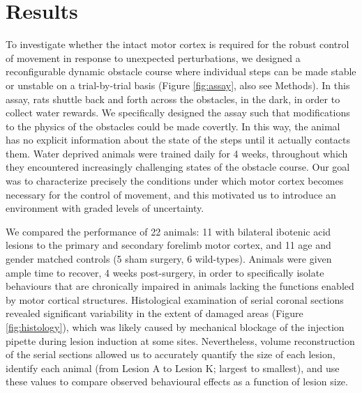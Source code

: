\section{Results}

To investigate whether the intact motor cortex is required for the robust control of movement in response to unexpected perturbations, we designed a reconfigurable dynamic obstacle course where individual steps can be made stable or unstable on a trial-by-trial basis (Figure \ref{fig:assay}, also see Methods). In this assay, rats shuttle back and forth across the obstacles, in the dark, in order to collect water rewards. We specifically designed the assay such that modifications to the physics of the obstacles could be made covertly. In this way, the animal has no explicit information about the state of the steps until it actually contacts them. Water deprived animals were trained daily for 4 weeks, throughout which they encountered increasingly challenging states of the obstacle course. Our goal was to characterize precisely the conditions under which motor cortex becomes necessary for the control of movement, and this motivated us to introduce an environment with graded levels of uncertainty.

We compared the performance of 22 animals: 11 with bilateral ibotenic acid lesions to the primary and secondary forelimb motor cortex, and 11 age and gender matched controls (5 sham surgery, 6 wild-types). Animals were given ample time to recover, 4 weeks post-surgery, in order to specifically isolate behaviours that are chronically impaired in animals lacking the functions enabled by motor cortical structures. Histological examination of serial coronal sections revealed significant variability in the extent of damaged areas (Figure \ref{fig:histology}), which was likely caused by mechanical blockage of the injection pipette during lesion induction at some sites. Nevertheless, volume reconstruction of the serial sections allowed us to accurately quantify the size of each lesion, identify each animal (from Lesion A to Lesion K; largest to smallest), and use these values to compare observed behavioural effects as a function of lesion size.

